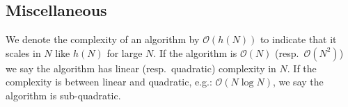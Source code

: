 \subsection*{Miscellaneous}
We denote the complexity of an algorithm by $\mathcal O(h(N))$ to indicate that it scales in $N$ like $h(N)$ for large $N$. If the algorithm is $\mathcal O(N)$ (resp.\ $\mathcal O(N^{2})$) we say the algorithm has linear (resp.\ quadratic) complexity in $N$. If the complexity is between linear and quadratic, e.g.: $\mathcal O(N\log N)$, we say the algorithm is sub-quadratic.


%
